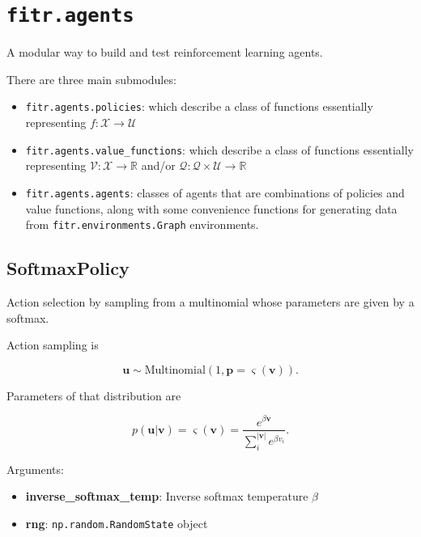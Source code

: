 \section{\texorpdfstring{\texttt{fitr.agents}}{fitr.agents}}\label{fitr.agents}

A modular way to build and test reinforcement learning agents.

There are three main submodules:

\begin{itemize}
\tightlist
\item
  \texttt{fitr.agents.policies}: which describe a class of functions
  essentially representing \(f:\mathcal X \to \mathcal U\)
\item
  \texttt{fitr.agents.value\_functions}: which describe a class of
  functions essentially representing
  \(\mathcal V: \mathcal X \to \mathbb R\) and/or
  \(\mathcal Q: \mathcal Q \times \mathcal U \to \mathbb R\)
\item
  \texttt{fitr.agents.agents}: classes of agents that are combinations
  of policies and value functions, along with some convenience functions
  for generating data from \texttt{fitr.environments.Graph}
  environments.
\end{itemize}

\subsection{SoftmaxPolicy}\label{softmaxpolicy}

\begin{Shaded}
\begin{Highlighting}[]
\end{Highlighting}
\end{Shaded}

Action selection by sampling from a multinomial whose parameters are
given by a softmax.

Action sampling is

\[
\mathbf u \sim \mathrm{Multinomial}(1, \mathbf p=\varsigma(\mathbf v)).
\]

Parameters of that distribution are

\[
p(\mathbf u|\mathbf v) = \varsigma(\mathbf v) = \frac{e^{\beta \mathbf v}}{\sum_{i}^{|\mathbf v|} e^{\beta v_i}}.
\]

Arguments:

\begin{itemize}
\tightlist
\item
  \textbf{inverse\_softmax\_temp}: Inverse softmax temperature \(\beta\)
\item
  \textbf{rng}: \texttt{np.random.RandomState} object
\end{itemize}

